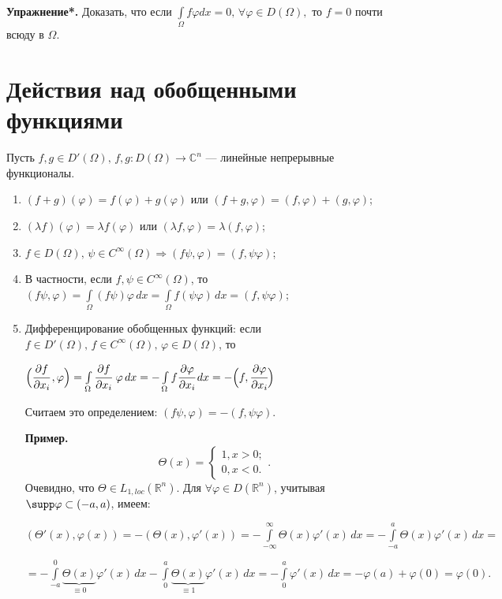 \documentclass[12pt,a4paper,draft]{article}
\DeclareRobustCommand*{\т}{~--- }
\DeclareRobustCommand*{\ч}{~-- }
\begin{document}
\textbf{Упражнение*.} Доказать, что если
$\int\limits_{\Omega}f\varphi dx=0,\,\forall\varphi\in D(\Omega),$
то $f=0$ почти всюду в $\Omega$.


\section{Действия над обобщенными функциями}

Пусть $f,g\in D'(\Omega),\,f,g\colon D(\Omega)\to\mathbb C^n$ ---
линейные непрерывные функционалы.

\begin{enumerate}
\item $(f+g)(\varphi)=f(\varphi)+g(\varphi)$ или
$(f+g,\varphi)=(f,\varphi)+(g,\varphi)$;
\item $(\lambda f)(\varphi)=\lambda f(\varphi)$ или $(\lambda
f,\varphi)=\lambda(f,\varphi)$;
\item $f\in D(\Omega),\,\psi\in C^{\infty}(\Omega) \Rightarrow
(f\psi,\varphi)=(f,\psi\varphi)$;
\item В частности, если $f,\psi\in C^{\infty}(\Omega)$, то
$(f\psi,\varphi)=\int\limits_{\Omega}(f\psi)\varphi\,
dx=\int\limits_{\Omega}f(\psi\varphi)\,dx=(f,\psi\varphi)$;
\item Дифференцирование обобщенных функций: если $f\in D'(\Omega),\,f\in C^{\infty}(\Omega),\,\varphi\in
D(\Omega)$, то

$\Bigl(\cfrac{\partial f}{\partial
x_i}\,,\varphi\Bigr)=\int\limits_{\Omega}\cfrac {\partial
f}{\partial x_i}\,\,\varphi\,dx=-\int\limits_{\Omega}f\cfrac
{\partial \varphi}{\partial x_i}\,dx=-\Bigl(f,\cfrac {\partial
\varphi}{\partial x_i}\Bigr)$

Считаем это определением: $(f\psi,\varphi)=-(f,\psi\varphi).$

\textbf{Пример.} $$\Theta(x)=\begin{cases} 1, x>0;\\ 0,
x<0.\end{cases}.$$ Очевидно, что $\Theta\in L_{1,loc}(\mathbb
R^n)$. Для $\forall \varphi \in D(\mathbb R^n)$, учитывая $\supp
\varphi\subset(-a,a)$, имеем:

$(\Theta'(x),\varphi(x))=-(\Theta(x),\varphi'(x))=-\int\limits_{-\infty}^{\infty}\Theta(x)\varphi'(x)\,dx=-\int\limits_{-a}^{a}\Theta(x)\varphi'(x)\,dx=$

$=-\int\limits_{-a}^0\underbrace{\Theta(x)}_{\equiv0}\varphi'(x)\,dx-\int\limits_0^a\underbrace{\Theta(x)}_{\equiv1}\varphi'(x)\,dx=-\int\limits_0^a\varphi'(x)\,dx=-\varphi(a)+\varphi(0)=\varphi(0).$


\end{enumerate}
\end{document}
